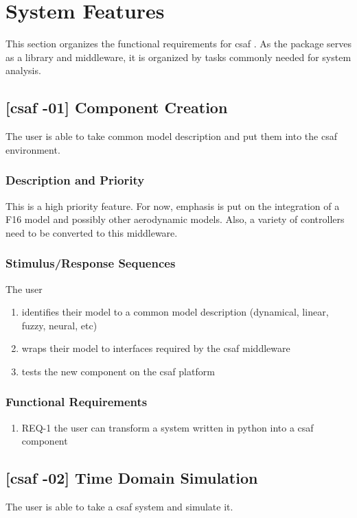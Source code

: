 \chapter{System Features}
This section organizes the functional requirements for \acrshort{csaf} . As the package serves as a library and middleware, it is organized by tasks commonly needed for system analysis.

\section{[\acrshort{csaf} -01] Component Creation}
The user is able to take common model description and put them into the \acrshort{csaf}  environment.

\subsection{Description and Priority}
This is a high priority feature. For now, emphasis is put on the integration of a F16 model and possibly other aerodynamic models. Also, a variety of controllers need to be converted to this middleware.

\subsection{Stimulus/Response Sequences}
The user
\begin{enumerate}
\item identifies their model to a common model description (dynamical, linear, fuzzy, neural, etc)
\item wraps their model to interfaces required by the \acrshort{csaf}  middleware
\item tests the new component on the \acrshort{csaf}  platform
\end{enumerate}

\subsection{Functional Requirements}
\begin{enumerate}
\item REQ-1 \quad the user can transform a system written in python into a \acrshort{csaf}  component
\end{enumerate}

\section{[\acrshort{csaf} -02] Time Domain Simulation}
The user is able to take a \acrshort{csaf}  system and simulate it.

